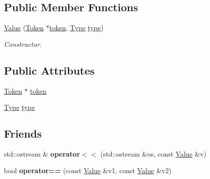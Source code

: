\subsection*{Public Member Functions}
\begin{DoxyCompactItemize}
\item 
\hyperlink{class_d_f_p_1_1_value_ab4bc39c8d0e04a5adf709e9b339ae930}{Value} (\hyperlink{class_d_f_p_1_1_token}{Token} $\ast$\hyperlink{class_d_f_p_1_1_value_a4cfafb890922feafab6d842a85812d10}{token}, \hyperlink{class_d_f_p_1_1_value_ab50504401cc3c884a5c6eb8708f8a214}{Type} \hyperlink{class_d_f_p_1_1_value_ae2c49913c035b9400361438ef5fe0f8e}{type})
\begin{DoxyCompactList}\small\item\em Constructor. \end{DoxyCompactList}\end{DoxyCompactItemize}
\subsection*{Public Attributes}
\begin{DoxyCompactItemize}
\item 
\hyperlink{class_d_f_p_1_1_token}{Token} $\ast$ \hyperlink{class_d_f_p_1_1_value_a4cfafb890922feafab6d842a85812d10}{token}
\item 
\hyperlink{class_d_f_p_1_1_value_ab50504401cc3c884a5c6eb8708f8a214}{Type} \hyperlink{class_d_f_p_1_1_value_ae2c49913c035b9400361438ef5fe0f8e}{type}
\end{DoxyCompactItemize}
\subsection*{Friends}
\begin{DoxyCompactItemize}
\item 
std\+::ostream \& {\bfseries operator$<$$<$} (std\+::ostream \&os, const \hyperlink{class_d_f_p_1_1_value}{Value} \&v)\hypertarget{class_d_f_p_1_1_value_ad29db86c4a2dec5bc8d0006031b07211}{}\label{class_d_f_p_1_1_value_ad29db86c4a2dec5bc8d0006031b07211}

\item 
bool {\bfseries operator==} (const \hyperlink{class_d_f_p_1_1_value}{Value} \&v1, const \hyperlink{class_d_f_p_1_1_value}{Value} \&v2)\hypertarget{class_d_f_p_1_1_value_afd4eae14a112344d5be0a51bd913941c}{}\label{class_d_f_p_1_1_value_afd4eae14a112344d5be0a51bd913941c}

\end{DoxyCompactItemize}


